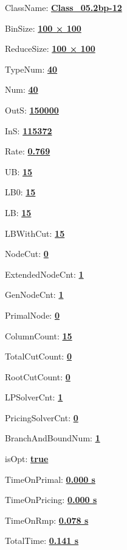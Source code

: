 \documentclass[11pt]{article}
\begin{document}
\pagestyle{empty}


ClassName: \underline{\textbf{Class_05.2bp-12}}
\par
BinSize: \underline{\textbf{100 × 100}}
\par
ReduceSize: \underline{\textbf{100 × 100}}
\par
TypeNum: \underline{\textbf{40}}
\par
Num: \underline{\textbf{40}}
\par
OutS: \underline{\textbf{150000}}
\par
InS: \underline{\textbf{115372}}
\par
Rate: \underline{\textbf{0.769}}
\par
UB: \underline{\textbf{15}}
\par
LB0: \underline{\textbf{15}}
\par
LB: \underline{\textbf{15}}
\par
LBWithCut: \underline{\textbf{15}}
\par
NodeCut: \underline{\textbf{0}}
\par
ExtendedNodeCnt: \underline{\textbf{1}}
\par
GenNodeCnt: \underline{\textbf{1}}
\par
PrimalNode: \underline{\textbf{0}}
\par
ColumnCount: \underline{\textbf{15}}
\par
TotalCutCount: \underline{\textbf{0}}
\par
RootCutCount: \underline{\textbf{0}}
\par
LPSolverCnt: \underline{\textbf{1}}
\par
PricingSolverCnt: \underline{\textbf{0}}
\par
BranchAndBoundNum: \underline{\textbf{1}}
\par
isOpt: \underline{\textbf{true}}
\par
TimeOnPrimal: \underline{\textbf{0.000 s}}
\par
TimeOnPricing: \underline{\textbf{0.000 s}}
\par
TimeOnRmp: \underline{\textbf{0.078 s}}
\par
TotalTime: \underline{\textbf{0.141 s}}
\par
\newpage


\end{document}
